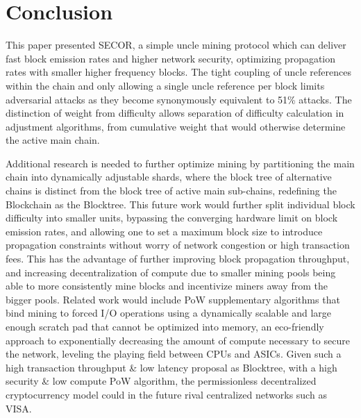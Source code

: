 \documentclass{article}
\begin{document}
\section{Conclusion}
This paper presented SECOR, a simple uncle mining protocol which can deliver fast block emission rates and higher network security, optimizing propagation rates with smaller higher frequency blocks. The tight coupling of uncle references within the chain and only allowing a single uncle reference per block limits adversarial attacks as they become synonymously equivalent to 51\% attacks. The distinction of weight from difficulty allows separation of difficulty calculation in adjustment algorithms, from cumulative weight that would otherwise determine the active main chain.

Additional research is needed to further optimize mining by partitioning the main chain into dynamically adjustable shards, where the block tree of alternative chains is distinct from the block tree of active main sub-chains, redefining the Blockchain as the Blocktree. This future work would further split individual block difficulty into smaller units, bypassing the converging hardware limit on block emission rates, and allowing one to set a maximum block size to introduce propagation constraints without worry of network congestion or high transaction fees. This has the advantage of further improving block propagation throughput, and increasing decentralization of compute due to smaller mining pools being able to more consistently mine blocks and incentivize miners away from the bigger pools. Related work would include PoW supplementary algorithms that bind mining to forced I/O operations using a dynamically scalable and large enough scratch pad that cannot be optimized into memory, an eco-friendly approach to exponentially decreasing the amount of compute necessary to secure the network, leveling the playing field between CPUs and ASICs. Given such a high transaction throughput \& low latency proposal as Blocktree, with a high security \& low compute PoW algorithm, the permissionless decentralized cryptocurrency model could in the future rival centralized networks such as VISA.
\end{document}
